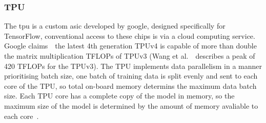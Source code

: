 \documentclass[../../D1.tex]{subfiles}
\begin{document}
\subsubsection{TPU}
The \acrshort{tpu} is a custom \acrshort{asic} developed by google, designed specifically for TensorFlow, conventional access to these chips is via a cloud computing service. 
Google claims~\autocite{GoogleWinsMLPerf}~the latest 4th generation TPUv4 is capable of more than double the matrix multiplication TFLOPs of TPUv3 (Wang et al.~\autocite{wangBenchmarkingTPUGPU2019}~describes a peak of 420 TFLOPs for the TPUv3).
The TPU implements data parallelism in a manner prioritising batch size, one batch of training data is split evenly and sent to each core of the TPU, so total on-board memory determins the maximum data batch size.
Each TPU core has a complete copy of the model in memory, so the maximum size of the model is determined by the amount of memory avaliable to each core~\autocite{wangBenchmarkingTPUGPU2019}.
\end{document}

